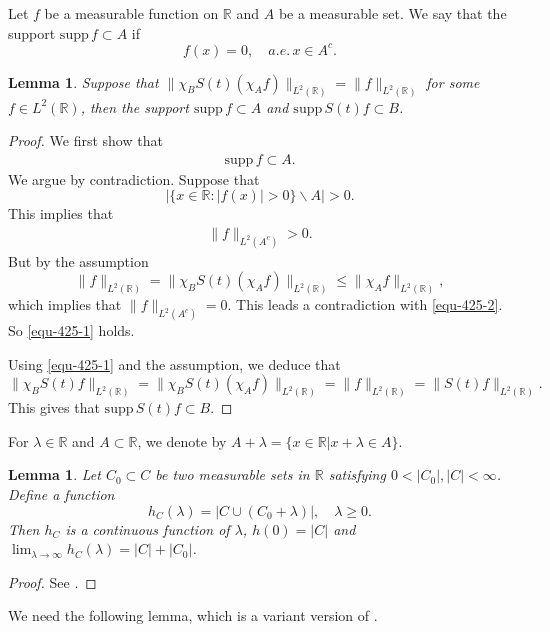 \documentclass[12pt]{amsart}
\def\R {\mathbb{R}}
\newtheorem{lemma}[proposition]{Lemma}
\theoremstyle{definition}
\numberwithin{equation}{section}
\begin{document}
Let $f$ be a measurable function on $\R$ and $A$ be a measurable set. We say that the support $\mathrm{supp } \, f\subset A$ if
$$
f(x)=0, \quad a.e. \, x\in A^c.
$$

\begin{lemma}\label{lem-2}
Suppose that $\|\chi_BS(t)(\chi_Af)\|_{L^2(\R)}=\|f\|_{L^2(\R)}$ for some $f\in L^2(\R)$, then the support $\mathrm{supp } \, f\subset A$
and $\mathrm{supp } \, S(t)f \subset B$.
\end{lemma}
\begin{proof}
We first show that
\begin{align}\label{equ-425-1}
\mathrm{supp }  \, f\subset A.
\end{align}
We argue by contradiction. Suppose that
$$
\Big|\{x\in \R: |f(x)|>0\} \backslash A \Big|>0.
$$
This implies that
\begin{align}\label{equ-425-2}
\|f\|_{L^2(A^c)}>0.
\end{align}
But by the assumption
$$
\|f\|_{L^2(\R)}=\|\chi_BS(t)(\chi_Af)\|_{L^2(\R)}\leq \|\chi_Af\|_{L^2(\R)},
$$
which implies that $\|f\|_{L^2(A^c)}=0$. This leads a contradiction with \eqref{equ-425-2}. So \eqref{equ-425-1} holds.

Using \eqref{equ-425-1} and the assumption, we deduce that
$$
\|\chi_BS(t)f\|_{L^2(\R)}=\|\chi_BS(t)(\chi_Af)\|_{L^2(\R)}=\|f\|_{L^2(\R)}=\|S(t)f\|_{L^2(\R)}.
$$
This gives that $\mathrm{supp } \, S(t)f \subset B$.
\end{proof}

For $\lambda\in \R$ and $A\subset\mathbb{R}$, we denote by $A+\lambda=\{x\in \mathbb{R}\lvert x+\lambda \in A\}$.
\begin{lemma}\label{lem-3}
Let $C_0\subset C$ be two measurable sets in $\R$ satisfying $0<|C_0|,|C|<\infty$. Define a function
$$
h_C(\lambda)=|C\cup (C_0+\lambda)|, \quad \lambda\geq 0.
$$
Then $h_C$ is a continuous function of $\lambda$, $h(0)=|C|$ and $\lim_{\lambda\to \infty}\limits h_C(\lambda)=|C|+|C_0|$.
\end{lemma}
\begin{proof}
See \cite[p.99]{Havin}.
\end{proof}

We need the following lemma, which is a variant version of \cite[Lemma 1]{Amrein}.
\end{document}
